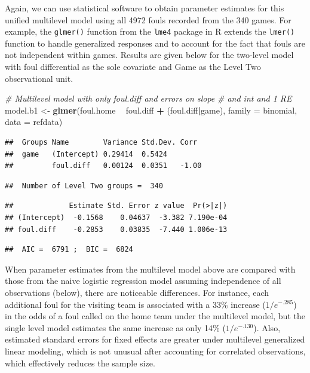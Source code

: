 \documentclass[
]{krantz}
\newenvironment{Shaded}{\begin{snugshade}}{\end{snugshade}}
\newcommand{\CommentTok}[1]{\textcolor[rgb]{0.37,0.37,0.37}{\textit{#1}}}
\newcommand{\DataTypeTok}[1]{\textcolor[rgb]{0.27,0.27,0.27}{#1}}
\newcommand{\KeywordTok}[1]{\textcolor[rgb]{0.27,0.27,0.27}{\textbf{#1}}}
\newcommand{\NormalTok}[1]{#1}
\newcommand{\OperatorTok}[1]{\textcolor[rgb]{0.43,0.43,0.43}{\textbf{#1}}}
\newcommand{\StringTok}[1]{\textcolor[rgb]{0.5,0.5,0.5}{#1}}
\begin{document}
Again, we can use statistical software to obtain parameter estimates for this unified multilevel model using all 4972 fouls recorded from the 340 games. For example, the \texttt{glmer()} function from the \texttt{lme4} package in R extends the \texttt{lmer()} function to handle generalized responses and to account for the fact that fouls are not independent within games. Results are given below for the two-level model with foul differential as the sole covariate and Game as the Level Two observational unit.

\begin{Shaded}
\begin{Highlighting}[]
\CommentTok{# Multilevel model with only foul.diff and errors on slope }
\CommentTok{#   and int and 1 RE}
\NormalTok{model.b1 <-}\StringTok{ }\KeywordTok{glmer}\NormalTok{(foul.home }\OperatorTok{~}\StringTok{ }\NormalTok{foul.diff }\OperatorTok{+}\StringTok{ }\NormalTok{(foul.diff}\OperatorTok{|}\NormalTok{game),}
                  \DataTypeTok{family =}\NormalTok{ binomial, }\DataTypeTok{data =}\NormalTok{ refdata)}
\end{Highlighting}
\end{Shaded}

\begin{verbatim}
##  Groups Name        Variance Std.Dev. Corr 
##  game   (Intercept) 0.29414  0.5424        
##         foul.diff   0.00124  0.0351   -1.00
\end{verbatim}

\begin{verbatim}
##  Number of Level Two groups =  340
\end{verbatim}

\begin{verbatim}
##             Estimate Std. Error z value  Pr(>|z|)
## (Intercept)  -0.1568    0.04637  -3.382 7.190e-04
## foul.diff    -0.2853    0.03835  -7.440 1.006e-13
\end{verbatim}

\begin{verbatim}
##  AIC =  6791 ;  BIC =  6824
\end{verbatim}

When parameter estimates from the multilevel model above are compared with those from the naive logistic regression model assuming independence of all observations (below), there are noticeable differences. For instance, each additional foul for the visiting team is associated with a 33\% increase (\(1/e^{-.285}\)) in the odds of a foul called on the home team under the multilevel model, but the single level model estimates the same increase as only 14\% (\(1/e^{-.130}\)). Also, estimated standard errors for fixed effects are greater under multilevel generalized linear modeling, which is not unusual after accounting for correlated observations, which effectively reduces the sample size.
\end{document}
